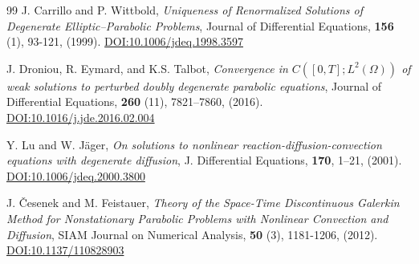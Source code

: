 \documentclass[review,11pt]{article}
\numberwithin{equation}{section}
\begin{document}
\begin{thebibliography}{99}
J. Carrillo and P. Wittbold, \emph{Uniqueness of Renormalized Solutions of Degenerate Elliptic--Parabolic Problems}, Journal of Differential Equations, \textbf{156} (1), 93-121, (1999). \href{https://doi.org/10.1006/jdeq.1998.3597}
{DOI:10.1006/jdeq.1998.3597}

J. Droniou, R. Eymard, and K.S. Talbot, \emph{Convergence in {$C([0,T];L^2(\Omega))$} of weak solutions to
perturbed doubly degenerate parabolic equations}, Journal of Differential Equations, \textbf{260} (11), 7821--7860, (2016). \href{https://doi.org/10.1016/j.jde.2016.02.004}
{DOI:10.1016/j.jde.2016.02.004}


Y. Lu and W. J\"ager, \emph{On solutions to nonlinear reaction-diffusion-convection
equations with degenerate diffusion}, J. Differential Equations, \textbf{170}, 1--21, (2001).
\href{https://doi.org/10.1006/jdeq.2000.3800}
{DOI:10.1006/jdeq.2000.3800}


J. \v{C}esenek and M. Feistauer, \emph{Theory of the {Space-Time} {Discontinuous} {Galerkin} {Method for Nonstationary Parabolic Problems with Nonlinear Convection and Diffusion}}, SIAM Journal on Numerical Analysis, \textbf{50} (3), 1181-1206, (2012). \href{https://doi.org/10.1137/110828903}{DOI:10.1137/110828903}

\end{thebibliography}
\end{document}
